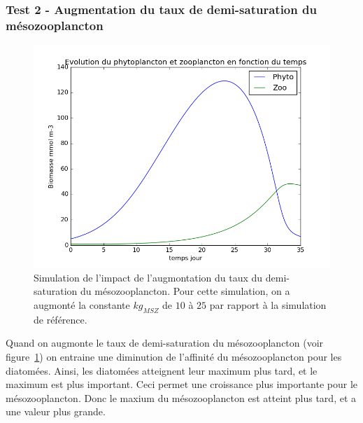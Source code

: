 {\subsubsection{Test 2 - Augmentation du taux de demi-saturation du mésozooplancton}
\begin{figure}[h!]
  \includegraphics[width=\textwidth]{partie1/test2x35.png}
  \caption{Simulation de l'impact de l'augmontation du taux du demi-saturation du mésozooplancton. Pour
cette simulation, on a augmonté la constante $kg_{MSZ}$ de $10$ à $25$ par rapport à la simulation de
référence.}
  \label{fig:partie1t2}
\end{figure}
\par{
Quand on augmonte le taux de demi-saturation du mésozooplancton (voir figure~\ref{fig:partie1t2})
on entraine une diminution de l'affinité du mésozooplancton pour les diatomées. Ainsi, les diatomées
atteignent leur maximum plus tard, et le maximum est plus important. Ceci permet une croissance plus
importante pour le mésozooplancton. Donc le maxium du mésozooplancton est atteint plus tard,
et a une valeur plus grande. 
}
\FloatBarrier

\clearpage
}
